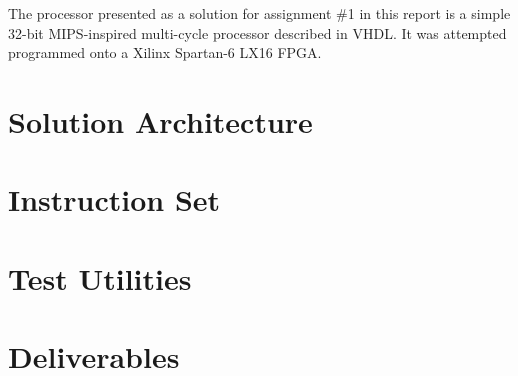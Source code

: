 The processor presented as a solution for assignment \#1 in this report is a simple 32-bit MIPS-inspired multi-cycle processor described in VHDL.
It was attempted programmed onto a Xilinx Spartan-6 LX16 FPGA.

\section{Solution Architecture}



\section{Instruction Set}
\label{section:instruction-set}

 \label{sec:instruction-set}

\section{Test Utilities}



\section{Deliverables}


